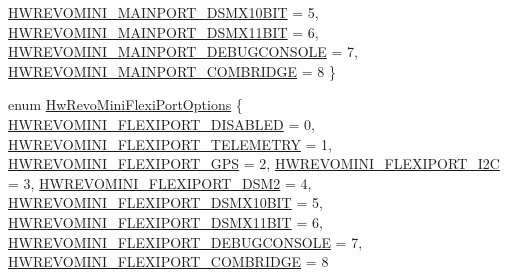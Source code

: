 \begin{DoxyCompactItemize}
\hyperlink{group___hw_revo_mini_gga20d56956ce6e880f1f1f115c915234bda8b12dedc17eb7f0b135e0cccae0b941a}{\-H\-W\-R\-E\-V\-O\-M\-I\-N\-I\-\_\-\-M\-A\-I\-N\-P\-O\-R\-T\-\_\-\-D\-S\-M\-X10\-B\-I\-T} = 5, 
\hyperlink{group___hw_revo_mini_gga20d56956ce6e880f1f1f115c915234bdaef555c420c574e27fec8496e32b93f49}{\-H\-W\-R\-E\-V\-O\-M\-I\-N\-I\-\_\-\-M\-A\-I\-N\-P\-O\-R\-T\-\_\-\-D\-S\-M\-X11\-B\-I\-T} = 6, 
\hyperlink{group___hw_revo_mini_gga20d56956ce6e880f1f1f115c915234bdaf4f351f3e0f5b4efd0c7d074314a976c}{\-H\-W\-R\-E\-V\-O\-M\-I\-N\-I\-\_\-\-M\-A\-I\-N\-P\-O\-R\-T\-\_\-\-D\-E\-B\-U\-G\-C\-O\-N\-S\-O\-L\-E} = 7, 
\*
\hyperlink{group___hw_revo_mini_gga20d56956ce6e880f1f1f115c915234bdaf6e4f970d1d1f58861e8e417cc93edca}{\-H\-W\-R\-E\-V\-O\-M\-I\-N\-I\-\_\-\-M\-A\-I\-N\-P\-O\-R\-T\-\_\-\-C\-O\-M\-B\-R\-I\-D\-G\-E} = 8
 \}
\item 
enum \hyperlink{group___hw_revo_mini_ga53a4aefbf3627919d4aa241e65a0fce8}{\-Hw\-Revo\-Mini\-Flexi\-Port\-Options} \{ \*
\hyperlink{group___hw_revo_mini_gga53a4aefbf3627919d4aa241e65a0fce8abaced25d97f83919277ab100c1e29795}{\-H\-W\-R\-E\-V\-O\-M\-I\-N\-I\-\_\-\-F\-L\-E\-X\-I\-P\-O\-R\-T\-\_\-\-D\-I\-S\-A\-B\-L\-E\-D} = 0, 
\hyperlink{group___hw_revo_mini_gga53a4aefbf3627919d4aa241e65a0fce8a59f6689825d1ebd21954a0280a467eb9}{\-H\-W\-R\-E\-V\-O\-M\-I\-N\-I\-\_\-\-F\-L\-E\-X\-I\-P\-O\-R\-T\-\_\-\-T\-E\-L\-E\-M\-E\-T\-R\-Y} = 1, 
\hyperlink{group___hw_revo_mini_gga53a4aefbf3627919d4aa241e65a0fce8a205e225b6695021453f76f79c3fd04e3}{\-H\-W\-R\-E\-V\-O\-M\-I\-N\-I\-\_\-\-F\-L\-E\-X\-I\-P\-O\-R\-T\-\_\-\-G\-P\-S} = 2, 
\hyperlink{group___hw_revo_mini_gga53a4aefbf3627919d4aa241e65a0fce8a69b277cbf1e2bead19b0e1aeb42b7e6b}{\-H\-W\-R\-E\-V\-O\-M\-I\-N\-I\-\_\-\-F\-L\-E\-X\-I\-P\-O\-R\-T\-\_\-\-I2\-C} = 3, 
\*
\hyperlink{group___hw_revo_mini_gga53a4aefbf3627919d4aa241e65a0fce8a0cff7bd3a05054980b59d8ba898d8576}{\-H\-W\-R\-E\-V\-O\-M\-I\-N\-I\-\_\-\-F\-L\-E\-X\-I\-P\-O\-R\-T\-\_\-\-D\-S\-M2} = 4, 
\hyperlink{group___hw_revo_mini_gga53a4aefbf3627919d4aa241e65a0fce8a568f8c4c01ce5d1cb2f5ed55addc971f}{\-H\-W\-R\-E\-V\-O\-M\-I\-N\-I\-\_\-\-F\-L\-E\-X\-I\-P\-O\-R\-T\-\_\-\-D\-S\-M\-X10\-B\-I\-T} = 5, 
\hyperlink{group___hw_revo_mini_gga53a4aefbf3627919d4aa241e65a0fce8ad173d7e5311995cebc89a1b8b003b856}{\-H\-W\-R\-E\-V\-O\-M\-I\-N\-I\-\_\-\-F\-L\-E\-X\-I\-P\-O\-R\-T\-\_\-\-D\-S\-M\-X11\-B\-I\-T} = 6, 
\hyperlink{group___hw_revo_mini_gga53a4aefbf3627919d4aa241e65a0fce8ae7c85ba4c28c0a91fbaf66607c91f34d}{\-H\-W\-R\-E\-V\-O\-M\-I\-N\-I\-\_\-\-F\-L\-E\-X\-I\-P\-O\-R\-T\-\_\-\-D\-E\-B\-U\-G\-C\-O\-N\-S\-O\-L\-E} = 7, 
\*
\hyperlink{group___hw_revo_mini_gga53a4aefbf3627919d4aa241e65a0fce8a667630882063edef1f21b3f92e7de92d}{\-H\-W\-R\-E\-V\-O\-M\-I\-N\-I\-\_\-\-F\-L\-E\-X\-I\-P\-O\-R\-T\-\_\-\-C\-O\-M\-B\-R\-I\-D\-G\-E} = 8

\end{DoxyCompactItemize}

